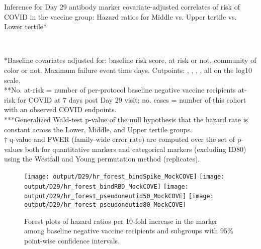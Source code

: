 \documentclass[
]{article}
\begin{document}
\begin{table}[H]
\caption{Inference for Day 29 antibody marker covariate-adjusted correlates of risk of COVID in the vaccine group: Hazard ratios for Middle vs. Upper tertile vs. Lower tertile*}
\begin{center}
\setlength{\tabcolsep}{.5ex}
\\
\end{center}
*Baseline covariates adjusted for: baseline risk score, at risk or not, community of color or not. 
Maximum failure event time \protect days.
Cutpoints:
,  
,  
,
,
all on the log10 scale.
\\
**No. at-risk = number of per-protocol baseline negative vaccine recipients at-risk for COVID at 7 days post Day 29 visit; no. cases = number of this cohort with an observed COVID endpoints.\\
***Generalized Wald-test p-value of the null hypothesis that the hazard rate is constant across the Lower, Middle, and Upper tertile groups.\\
$\dagger$ q-value and FWER (family-wide error rate) are computed over the set of p-values both for quantitative markers and categorical markers (excluding ID80) using the Westfall and Young permutation method (\protect replicates). 

\end{table}

\begin{figure}[H]
    \texttt{[image: output/D29/hr\_forest\_bindSpike\_MockCOVE]}
    \texttt{[image: output/D29/hr\_forest\_bindRBD\_MockCOVE]}
    \texttt{[image: output/D29/hr\_forest\_pseudoneutid50\_MockCOVE]}
    \texttt{[image: output/D29/hr\_forest\_pseudoneutid80\_MockCOVE]}
    \caption{Forest plots of hazard ratios per 10-fold increase in the marker among baseline negative vaccine recipients and subgroups with 95\% point-wise confidence intervals.}
\end{figure}
\clearpage
\end{document}
